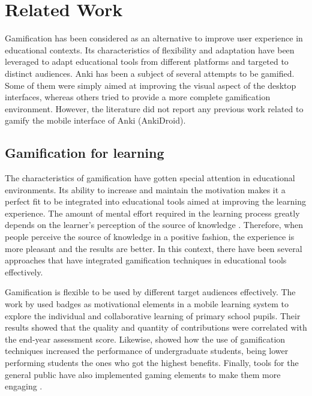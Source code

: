 
\chapter{Related Work} %

\label{rela} %


Gamification has been considered as an alternative to improve user experience in educational contexts. Its characteristics of flexibility and adaptation have been leveraged to adapt educational tools from different platforms and targeted to distinct audiences. Anki has been a subject of several attempts to be gamified. Some of them were simply aimed at improving the visual aspect of the desktop interfaces, whereas others tried to provide a more complete gamification environment. However, the literature did not report any previous work related to gamify the mobile interface of Anki (AnkiDroid).

\section{Gamification for learning}
The characteristics of gamification have gotten special attention in educational environments. Its ability to increase and maintain the motivation makes it a perfect fit to be integrated into educational tools aimed at improving the learning experience. The amount of mental effort required in the learning process greatly depends on the learner's perception of the source of knowledge \citep{salomon1983differential}. Therefore, when people perceive the source of knowledge in a positive fashion, the experience is more pleasant and the results are better. In this context, there have been several approaches that have integrated gamification techniques in educational tools effectively.

Gamification is flexible to be used by different target audiences effectively. The work by \citep{boticki2015usage} used badges as motivational elements in a mobile learning system to explore the individual and collaborative learning of primary school pupils. Their results showed that the quality and quantity of contributions were correlated with the end-year assessment score. Likewise, \citep{slish2015gamification} showed how the use of gamification techniques increased the performance of undergraduate students, being lower performing students the ones who got the highest benefits. Finally, tools for the general public have also implemented gaming elements to make them more engaging \citep{morrison2014khan}.

